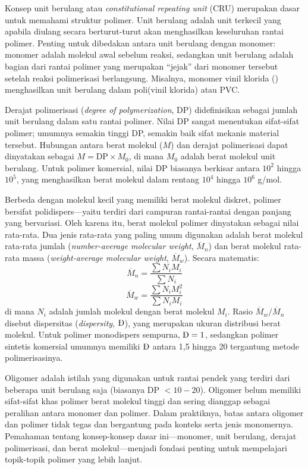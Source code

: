 \documentclass[12pt,a4paper,openany]{book}
\begin{document}
Konsep unit berulang atau \textit{constitutional repeating unit} (CRU) merupakan dasar untuk memahami struktur polimer. Unit berulang adalah unit terkecil yang apabila diulang secara berturut-turut akan menghasilkan keseluruhan rantai polimer. Penting untuk dibedakan antara unit berulang dengan monomer: monomer adalah molekul awal sebelum reaksi, sedangkan unit berulang adalah bagian dari rantai polimer yang merupakan ``jejak'' dari monomer tersebut setelah reaksi polimerisasi berlangsung. Misalnya, monomer vinil klorida () menghasilkan unit berulang  dalam poli(vinil klorida) atau PVC.

Derajat polimerisasi (\textit{degree of polymerization}, DP) didefinisikan sebagai jumlah unit berulang dalam satu rantai polimer. Nilai DP sangat menentukan sifat-sifat polimer; umumnya semakin tinggi DP, semakin baik sifat mekanis material tersebut. Hubungan antara berat molekul ($M$) dan derajat polimerisasi dapat dinyatakan sebagai $M = \text{DP} \times M_0$, di mana $M_0$ adalah berat molekul unit berulang. Untuk polimer komersial, nilai DP biasanya berkisar antara $10^2$ hingga $10^5$, yang menghasilkan berat molekul dalam rentang $10^4$ hingga $10^6$ g/mol.

Berbeda dengan molekul kecil yang memiliki berat molekul diskret, polimer bersifat polidispers---yaitu terdiri dari campuran rantai-rantai dengan panjang yang bervariasi. Oleh karena itu, berat molekul polimer dinyatakan sebagai nilai rata-rata. Dua jenis rata-rata yang paling umum digunakan adalah berat molekul rata-rata jumlah (\textit{number-average molecular weight}, $\overline{M}_n$) dan berat molekul rata-rata massa (\textit{weight-average molecular weight}, $\overline{M}_w$). Secara matematis:
\begin{equation}
  \overline{M}_n = \frac{\sum N_i M_i}{\sum N_i}
\end{equation}
\begin{equation}
  \overline{M}_w = \frac{\sum N_i M_i^2}{\sum N_i M_i}
\end{equation}
di mana $N_i$ adalah jumlah molekul dengan berat molekul $M_i$. Rasio $\overline{M}_w / \overline{M}_n$ disebut dispersitas (\textit{dispersity}, $\text{\DH}$), yang merupakan ukuran distribusi berat molekul. Untuk polimer monodispers sempurna, $\text{\DH} = 1$, sedangkan polimer sintetis komersial umumnya memiliki $\text{\DH}$ antara 1,5 hingga 20 tergantung metode polimerisasinya.

Oligomer adalah istilah yang digunakan untuk rantai pendek yang terdiri dari beberapa unit berulang saja (biasanya DP $< 10-20$). Oligomer belum memiliki sifat-sifat khas polimer berat molekul tinggi dan sering dianggap sebagai peralihan antara monomer dan polimer. Dalam praktiknya, batas antara oligomer dan polimer tidak tegas dan bergantung pada konteks serta jenis monomernya. Pemahaman tentang konsep-konsep dasar ini---monomer, unit berulang, derajat polimerisasi, dan berat molekul---menjadi fondasi penting untuk mempelajari topik-topik polimer yang lebih lanjut.
\end{document}
